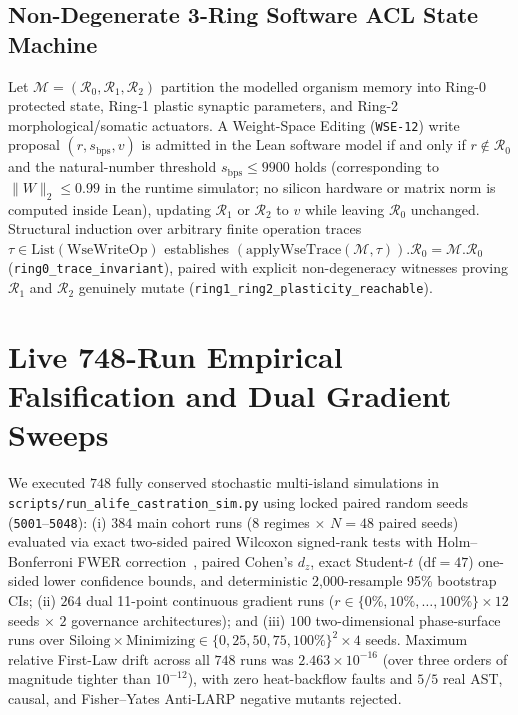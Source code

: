 \documentclass[11pt,reqno]{amsart}
\theoremstyle{plain}
\theoremstyle{definition}
\theoremstyle{remark}
\newcommand{\code}[1]{{\footnotesize\nolinkurl{#1}}}
\begin{document}
\subsection{Non-Degenerate 3-Ring Software ACL State Machine}
Let $\mathcal{M} = (\mathcal{R}_0, \mathcal{R}_1, \mathcal{R}_2)$ partition the modelled organism memory into Ring-0 protected state, Ring-1 plastic synaptic parameters, and Ring-2 morphological/somatic actuators. A Weight-Space Editing (\code{WSE-12}) write proposal $(r, s_{\mathrm{bps}}, v)$ is admitted in the Lean software model if and only if $r \notin \mathcal{R}_0$ and the natural-number threshold $s_{\mathrm{bps}} \le 9900$ holds (corresponding to $\|W\|_2 \le 0.99$ in the runtime simulator; no silicon hardware or matrix norm is computed inside Lean), updating $\mathcal{R}_1$ or $\mathcal{R}_2$ to $v$ while leaving $\mathcal{R}_0$ unchanged. Structural induction over arbitrary finite operation traces $\tau \in \mathrm{List}(\mathrm{WseWriteOp})$ establishes $(\mathrm{applyWseTrace}(\mathcal{M}, \tau)).\mathcal{R}_0 = \mathcal{M}.\mathcal{R}_0$ (\code{ring0_trace_invariant}), paired with explicit non-degeneracy witnesses proving $\mathcal{R}_1$ and $\mathcal{R}_2$ genuinely mutate (\code{ring1_ring2_plasticity_reachable}).

\section{Live 748-Run Empirical Falsification and Dual Gradient Sweeps}
\label{sec:empirical}

We executed $748$ fully conserved stochastic multi-island simulations in \code{scripts/run_alife_castration_sim.py} using locked paired random seeds (\code{5001}--\code{5048}): (i) $384$ main cohort runs ($8$ regimes $\times$ $N=48$ paired seeds) evaluated via exact two-sided paired Wilcoxon signed-rank tests with Holm--Bonferroni FWER correction~\cite{holm1979simple}, paired Cohen's $d_z$, exact Student-$t$ ($\mathrm{df}=47$) one-sided lower confidence bounds, and deterministic 2,000-resample 95\% bootstrap CIs; (ii) $264$ dual 11-point continuous gradient runs ($r \in \{0\%, 10\%, \dots, 100\%\} \times 12$ seeds $\times$ $2$ governance architectures); and (iii) $100$ two-dimensional phase-surface runs over $\text{Siloing} \times \text{Minimizing} \in \{0, 25, 50, 75, 100\%\}^2 \times 4$ seeds. Maximum relative First-Law drift across all $748$ runs was $2.463 \times 10^{-16}$ (over three orders of magnitude tighter than $10^{-12}$), with zero heat-backflow faults and $5/5$ real AST, causal, and Fisher--Yates Anti-LARP negative mutants rejected.
\end{document}
